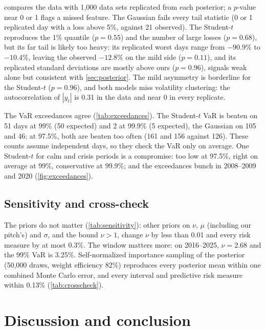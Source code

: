 \documentclass[12pt]{article}
\begin{document}
 compares the data with 1,000 data sets replicated from each posterior; a $p$-value near 0 or 1 flags a missed feature. The Gaussian fails every tail statistic (0 or 1 replicated day with a loss above 5\%, against 21 observed). The Student-$t$ reproduces the 1\% quantile ($p = 0.55$) and the number of large losses ($p = 0.68$), but its far tail is likely too heavy: its replicated worst days range from $-90.9\%$ to $-10.4\%$, leaving the observed $-12.8\%$ on the mild side ($p = 0.11$), and its replicated standard deviations are mostly above ours ($p = 0.96$), signals weak alone but consistent with \cref{sec:posterior}. The mild asymmetry is borderline for the Student-$t$ ($p = 0.96$), and both models miss volatility clustering: the autocorrelation of $|y_t|$ is 0.31 in the data and near 0 in every replicate.


The VaR exceedances agree (\cref{tab:exceedances}). The Student-$t$ VaR is beaten on 51 days at 99\% (50 expected) and 2 at 99.9\% (5 expected), the Gaussian on 105 and 46; at 97.5\%, both are beaten too often (161 and 156 against 126). These counts assume independent days, so they check the VaR only on average. One Student-$t$ for calm and crisis periods is a compromise: too low at 97.5\%, right on average at 99\%, conservative at 99.9\%; and the exceedances bunch in 2008--2009 and 2020 (\cref{fig:exceedances}).


\subsection{Sensitivity and cross-check}\label{sec:sensitivity}

The priors do not matter (\cref{tab:sensitivity}): other priors on $\nu$, $\mu$ (including our pitch's) and $\sigma$, and the bound $\nu > 1$, change $\nu$ by less than 0.01 and every risk measure by at most 0.3\%. The window matters more: on 2016--2025, $\nu = 2.68$ and the 99\% VaR is 3.25\%. Self-normalized importance sampling of the posterior (50,000 draws, weight efficiency 82\%) reproduces every posterior mean within one combined Monte Carlo error, and every interval and predictive risk measure within 0.13\% (\cref{tab:crosscheck}).

\section{Discussion and conclusion}\label{sec:discussion}
\end{document}
